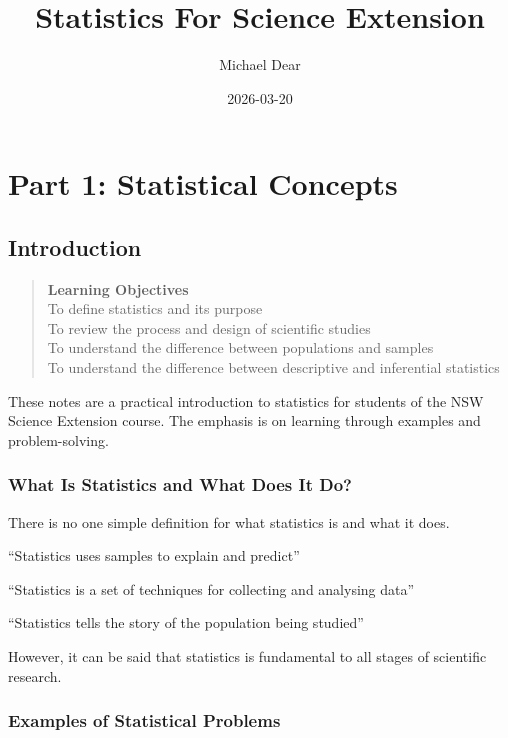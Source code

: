 \documentclass[
]{book}
\title{Statistics For Science Extension}
\author{Michael Dear}
\date{2026-03-20}
\begin{document}
\maketitle

{
\setcounter{tocdepth}{1}
\tableofcontents
}
\part*{Part 1: Statistical Concepts}\label{part-part-1-statistical-concepts}

\chapter{Introduction}\label{introduction}

\begin{quote}
\textbf{Learning Objectives}\\
To define statistics and its purpose\\
To review the process and design of scientific studies\\
To understand the difference between populations and samples\\
To understand the difference between descriptive and inferential statistics
\end{quote}

These notes are a practical introduction to statistics for students of the NSW Science Extension course. The emphasis is on learning through examples and problem-solving.

\section{What Is Statistics and What Does It Do?}\label{what-is-statistics-and-what-does-it-do}

There is no one simple definition for what statistics is and what it does.

``Statistics uses samples to explain and predict''

``Statistics is a set of techniques for collecting and analysing data''

``Statistics tells the story of the population being studied''

However, it can be said that statistics is fundamental to all stages of scientific research.

\section{Examples of Statistical Problems}\label{examples-of-statistical-problems}
\end{document}
